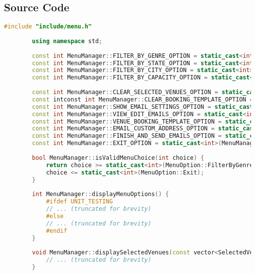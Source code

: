 \documentclass{article}
\begin{document}
	\subsection*{Source Code}
	\begin{mdframed}[backgroundcolor=background, hidealllines=false, innerleftmargin=15pt, innerrightmargin=5pt, innertopmargin=0pt, innerbottommargin=-5pt]
	\begin{lstlisting}[language=C++]
		#include "include/menu.h"
		
		using namespace std;
		
		const int MenuManager::FILTER_BY_GENRE_OPTION = static_cast<int>(MenuManager::MenuOption::FilterByGenre);
		const int MenuManager::FILTER_BY_STATE_OPTION = static_cast<int>(MenuManager::MenuOption::FilterByState);
		const int MenuManager::FILTER_BY_CITY_OPTION = static_cast<int>(MenuManager::MenuOption::FilterByCity);
		const int MenuManager::FILTER_BY_CAPACITY_OPTION = static_cast<int>(MenuManager::MenuOption::FilterByCapacity);
		
		const int MenuManager::CLEAR_SELECTED_VENUES_OPTION = static_cast<int>(MenuManager::MenuOption::ClearSelectedVenues);
		const intconst int MenuManager::CLEAR_BOOKING_TEMPLATE_OPTION = static_cast<int>(MenuManager::MenuOption::ClearBookingTemplate); MenuManager::VIEW_SELECTED_VENUES_OPTION = static_cast<int>(MenuManager::MenuOption::ViewSelectedVenues);
		const int MenuManager::SHOW_EMAIL_SETTINGS_OPTION = static_cast<int>(MenuManager::MenuOption::ShowEmailSettings);
		const int MenuManager::VIEW_EDIT_EMAILS_OPTION = static_cast<int>(MenuManager::MenuOption::ViewEditEmail);
		const int MenuManager::VENUE_BOOKING_TEMPLATE_OPTION = static_cast<int>(MenuManager::MenuOption::VenueBookingTemplate);
		const int MenuManager::EMAIL_CUSTOM_ADDRESS_OPTION = static_cast<int>(MenuManager::MenuOption::EmailCustomAddress);
		const int MenuManager::FINISH_AND_SEND_EMAILS_OPTION = static_cast<int>(MenuManager::MenuOption::FinishAndSendEmail);
		const int MenuManager::EXIT_OPTION = static_cast<int>(MenuManager::MenuOption::Exit);
		
		bool MenuManager::isValidMenuChoice(int choice) {
			return choice >= static_cast<int>(MenuOption::FilterByGenre) &&
			choice <= static_cast<int>(MenuOption::Exit);
		}
		
		int MenuManager::displayMenuOptions() {
			#ifdef UNIT_TESTING
			// ... (truncated for brevity)
			#else
			// ... (truncated for brevity)
			#endif
		}
		
		void MenuManager::displaySelectedVenues(const vector<SelectedVenue>& selectedVenues) {
			// ... (truncated for brevity)
		}
	\end{lstlisting}
	\end{mdframed}
\end{document}
